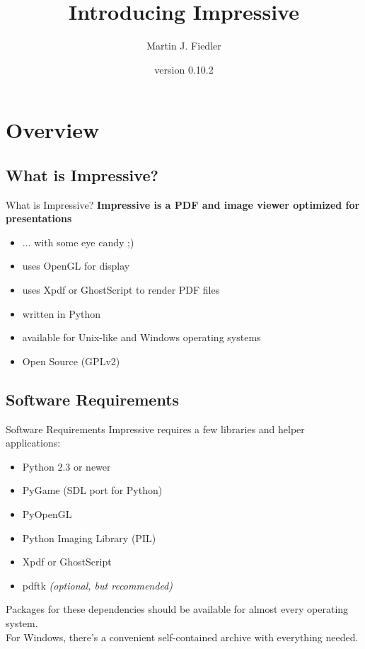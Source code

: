 \documentclass[bigger,hyperref={colorlinks=true,linkcolor=white,urlcolor=blue}]{beamer}
\title{Introducing Impressive}
\author{Martin J. Fiedler}
\date{version 0.10.2}
\begin{document}
\maketitle


\section{Overview}

\subsection{What is Impressive?}
\begin{frame}{What is Impressive?}
    \large
    \textbf{Impressive is a PDF and image viewer optimized for presentations}
    \normalsize
    \begin{itemize}
        \item ... with some eye candy ;)
        \item uses OpenGL for display
        \item uses Xpdf or GhostScript to render PDF files
        \item written in Python
        \item available for Unix-like and Windows operating systems
        \item Open Source (GPLv2)
    \end{itemize}
\end{frame}

\subsection{Software Requirements}
\begin{frame}{Software Requirements}
    Impressive requires a few libraries and helper applications:
    \begin{itemize}
        \item Python 2.3 or newer
        \item PyGame (SDL port for Python)
        \item PyOpenGL
        \item Python Imaging Library (PIL)
        \item Xpdf or GhostScript
        \item pdftk \emph{(optional, but recommended)}
    \end{itemize}
    Packages for these dependencies should be available for almost every
    operating system. \\
    For Windows, there's a convenient self-contained archive with
    everything needed.
\end{frame}
\end{document}
